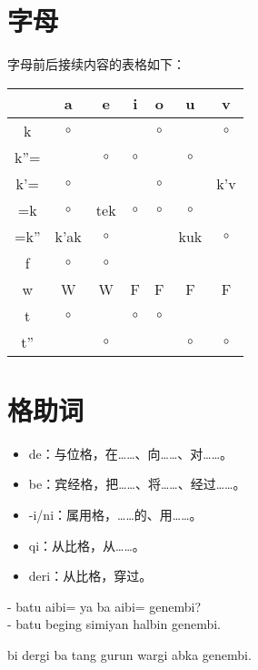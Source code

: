 \section{字母}

字母前后接续内容的表格如下：

\begin{tabular}{c|cccccc}
     & a & e & i & o & u & v \\
\hline
k   & $\circ$ & & & $\circ$ & & $\circ$ \\
k''= & & $\circ$ & $\circ$ & & $\circ$ \\
k'=  & $\circ$ & & & $\circ$ & & k'v\\
\hline
=k   & $\circ$ & tek &$\circ$&$\circ$&$\circ$\\
=k'' & k'ak & $\circ$ & & & kuk & $\circ$ \\
\hline
f    & $\circ$ & $\circ$ \\
w    & W & W & F & F & F & F\\
\hline
t    & $\circ$ & & $\circ$ & $\circ$\\
t''  & & $\circ$ & & & $\circ$ & $\circ$
\end{tabular}

\section{格助词}

\begin{itemize}
  \item de：与位格，在……、向……、对……。
  \item be：宾经格，把……、将……、经过……。
  \item -i/ni：属用格，……的、用……。
  \item qi：从比格，从……。
  \item deri：从比格，穿过。
\end{itemize}

- batu aibi= ya ba  aibi= genembi?\\
- batu beging  simiyan  halbin  genembi.

bi dergi ba   tang gurun  wargi abka      genembi.